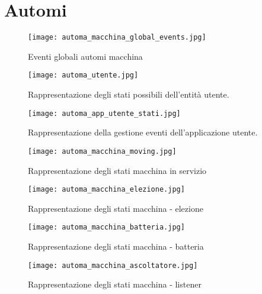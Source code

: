 
\chapter{Automi}\label{automi_appendix}
  
\begin{figure}[htbp]
	\centering
	\texttt{[image: automa\_macchina\_global\_events.jpg]}
	\caption{Eventi globali automi macchina}
	\label{fig:automi_macchina_various}
\end{figure}

\begin{figure}[htbp]
	\centering
	\texttt{[image: automa\_utente.jpg]}
	\caption{Rappresentazione degli stati possibili dell'entità utente.}
	\label{fig:automa_utente}
\end{figure}

\begin{figure}[htbp]
	\centering
	\texttt{[image: automa\_app\_utente\_stati.jpg]}
	\caption{Rappresentazione della gestione eventi dell'applicazione utente.}
	\label{fig:automa_app_utente_stati}
\end{figure}

\begin{figure}[htbp]
	\centering
	\texttt{[image: automa\_macchina\_moving.jpg]}
	\caption{Rappresentazione degli stati macchina in servizio}
	\label{fig:automa_moving}
\end{figure}

\begin{figure}[htbp]
	\centering
	\texttt{[image: automa\_macchina\_elezione.jpg]}
	\caption{Rappresentazione degli stati macchina - elezione}
	\label{fig:automa_elezione}
\end{figure}

\begin{figure}[htbp]
	\centering
	\texttt{[image: automa\_macchina\_batteria.jpg]}
	\caption{Rappresentazione degli stati macchina - batteria}
	\label{fig:automa_batteria}
\end{figure}

\begin{figure}[htbp]
	\centering
	\texttt{[image: automa\_macchina\_ascoltatore.jpg]}
	\caption{Rappresentazione degli stati macchina - listener}
	\label{fig:automa_listener}
\end{figure}

